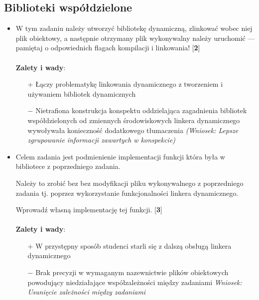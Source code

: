 \documentclass[12pt]{article}
\begin{document}
\subsection{Biblioteki współdzielone}
\begin{itemize}
\item W tym zadaniu należy utworzyć bibliotekę dynamiczną, zlinkować wobec niej
  plik obiektowy, a następnie otrzymany plik wykonywalny należy uruchomić ---
  pamiętaj o odpowiednich flagach kompilacji i linkowania! [\textbf{2}]\\ \\
  \textbf{Zalety i wady}:
  \begin{itemize}
  \item[$+$] Łączy problematykę linkowania dynamicznego z tworzeniem i używaniem
    bibliotek dynamicznych
  \item[$-$] Nietrafiona konstrukcja konspektu oddzielająca zagadnienia bibliotek
    współdzielonych od zmiennych środowiskowych linkera dynamicznego wywoływała
    konieczność dodatkowego tłumaczenia \textit{(Wniosek: Lepsze zgrupowanie
      informacji zawartych w konspekcie)}
  \end{itemize}
\item Celem zadania jest podmienienie implementacji funkcji która była w
  bibliotece z poprzedniego zadania.

  Należy to zrobić bez bez modyfikacji pliku wykonywalnego z poprzedniego
  zadania tj. poprzez wykorzystanie funkcjonalności linkera dynamicznego.

  Wprowadź własną implementację tej funkcji. [\textbf{3}]\\ \\
  \textbf{Zalety i wady}:
  \begin{itemize}
  \item[$+$] W przystępny sposób studenci starli się z dalszą obsługą linkera
    dynamicznego
  \item[$-$] Brak precyzji w wymaganym nazewnictwie plików obiektowych
    powodujący niedziałające współzależności między zadaniami \textit{Wniosek:
      Usunięcie zależności między zadaniami}
  \end{itemize}
\end{itemize}
\end{document}
